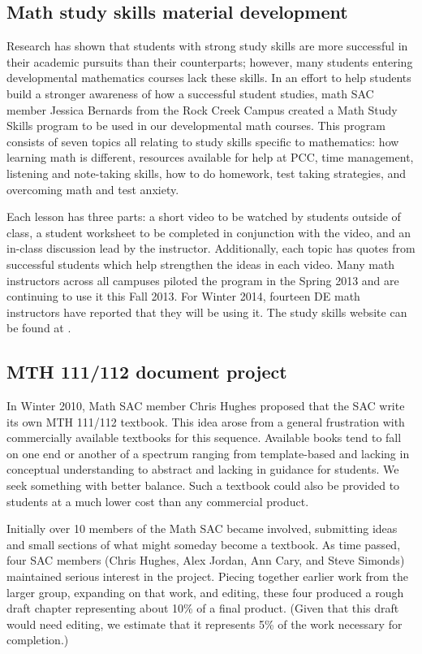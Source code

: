 \subsection{Math study skills material development}\label{cur:sub:studyskills}
Research has shown that students with strong study skills are more successful in
their academic pursuits than their counterparts; however, many
students entering developmental mathematics courses lack these skills.
In an effort to help students build a stronger awareness of how a successful
student studies, math SAC member Jessica Bernards from the Rock Creek Campus
created a Math Study Skills program to be used in our developmental math
courses.  This program consists of seven topics all relating to study skills
specific to mathematics: how learning math is different, resources available for
help at PCC, time management, listening and note-taking skills, how to do
homework, test taking strategies, and overcoming math and test anxiety.

Each lesson has three parts: a short video to be watched by students
outside of class, a student worksheet to be completed in conjunction with the
video, and an in-class discussion lead by the instructor. Additionally, each
topic has quotes from successful students which help strengthen the ideas in
each video.  Many math instructors across all campuses piloted the program in
the Spring 2013 and are continuing to use it this Fall 2013. For Winter 2014,
fourteen DE math instructors have reported that they will be using it. The study
skills website can be found at \cite{studyskills}.

\subsection{MTH 111/112 document project}\label{cur:sec:111/112doc}
In Winter 2010, Math SAC member Chris Hughes proposed that the SAC write its own
MTH 111/112 textbook. This idea arose from a general frustration with
commercially available textbooks for this sequence.  Available books tend to
fall on one end or another of a spectrum ranging from template-based and lacking
in conceptual understanding to abstract and lacking in guidance for students.
We seek something with better balance.  Such a
textbook could also be provided to students at a much lower cost than any commercial
product.

Initially over 10 members of the Math SAC became involved, submitting ideas and
small sections of what might someday become a textbook.  As time passed, four
SAC members (Chris Hughes, Alex Jordan, Ann Cary, and Steve Simonds) maintained
serious interest in the project.  Piecing together earlier work from the larger
group, expanding on that work, and editing, these four produced a rough draft
chapter representing about 10\% of a final product. (Given that this draft would
need editing, we estimate that it represents 5\% of the work necessary for
completion.)

